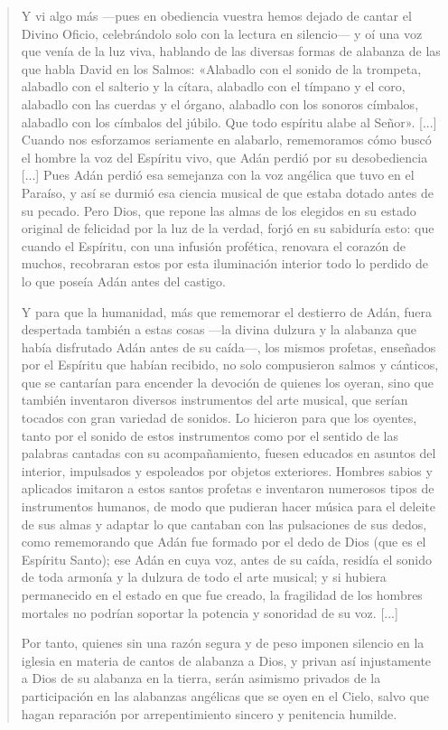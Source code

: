 \begin{quote}
\small{
Y vi algo más —pues en obediencia vuestra hemos dejado de cantar el Divino Oficio, celebrándolo solo con la lectura en silencio— y oí una voz que venía de la luz viva, hablando de las diversas formas de alabanza de las que habla David en los Salmos: «Alabadlo con el sonido de la trompeta, alabadlo con el salterio y la cítara, alabadlo con el tímpano y el coro, alabadlo con las cuerdas y el órgano, alabadlo con los sonoros címbalos, alabadlo con los címbalos del júbilo. Que todo espíritu alabe al Señor». [...] Cuando nos esforzamos seriamente en alabarlo, rememoramos cómo buscó el hombre la voz del Espíritu vivo, que Adán perdió por su desobediencia [...] Pues Adán perdió esa semejanza con la voz angélica que tuvo en el Paraíso, y así se durmió esa ciencia musical de que estaba dotado antes de su pecado. Pero Dios, que repone las almas de los elegidos en su estado original de felicidad por la luz de la verdad, forjó en su sabiduría esto: que cuando el Espíritu, con una infusión profética, renovara el corazón de muchos, recobraran estos por esta iluminación interior todo lo perdido de lo que poseía Adán antes del castigo.

Y para que la humanidad, más que rememorar el destierro de Adán, fuera despertada también a estas cosas —la divina dulzura y la alabanza que había disfrutado Adán antes de su caída—, los mismos profetas, enseñados por el Espíritu que habían recibido, no solo compusieron salmos y cánticos, que se cantarían para encender la devoción de quienes los oyeran, sino que también inventaron diversos instrumentos del arte musical, que serían tocados con gran variedad de sonidos. Lo hicieron para que los oyentes, tanto por el sonido de estos instrumentos como por el sentido de las palabras cantadas con su acompañamiento, fuesen educados en asuntos del interior, impulsados y espoleados por objetos exteriores. Hombres sabios y aplicados imitaron a estos santos profetas e inventaron numerosos tipos de instrumentos humanos, de modo que pudieran hacer música para el deleite de sus almas y adaptar lo que cantaban con las pulsaciones de sus dedos, como rememorando que Adán fue formado por el dedo de Dios (que es el Espíritu Santo); ese Adán en cuya voz, antes de su caída, residía el sonido de toda armonía y la dulzura de todo el arte musical; y si hubiera permanecido en el estado en que fue creado, la fragilidad de los hombres mortales no podrían soportar la potencia y sonoridad de su voz. [...]

Por tanto, quienes sin una razón segura y de peso imponen silencio en la iglesia en materia de cantos de alabanza a Dios, y privan así injustamente a Dios de su alabanza en la tierra, serán asimismo privados de la participación en las alabanzas angélicas que se oyen en el Cielo, salvo que hagan reparación por arrepentimiento sincero y penitencia humilde.
}
\end{quote}

